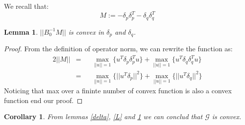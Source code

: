 \documentclass[11pt,twocolumn,varwidth=true,a4paper,fleqn]{article}
\newtheorem{lemma}{Lemma}
\newtheorem{corollary}{Corollary}
\begin{document}
We recall that:
\begin{equation*} 
M:= - \delta_p\delta_p^T - \delta_q\delta_q^T
\end{equation*}
\begin{lemma} \label{M}
$||B_0^{-1}M||$ is convex in $\delta_p$
and $\delta_q$.
\end{lemma}
\begin{proof}
From the definition of operator norm, we can rewrite the function as:
\begin{alignat*} {2}
||M|| & = && \max_{||u||=1}{\{u^T \delta_p\delta_p^T u\}} + \max_{||u||=1}{\{u^T \delta_q\delta_q^T u\}} \\
& = && \max_{||u||=1}{\{||u^T \delta_p||^2\}} + \max_{||u||=1}{\{||u^T
\delta_q||^2\}}
\end{alignat*}
Noticing that max over a fininte number of convex function is also a convex
function end our proof.
\end{proof}

\begin{corollary}
From lemmas \ref{delta}, \ref{L} and \ref{M} we can conclud that $\mathcal{G}$
is convex.
\end{corollary}
\end{document}
